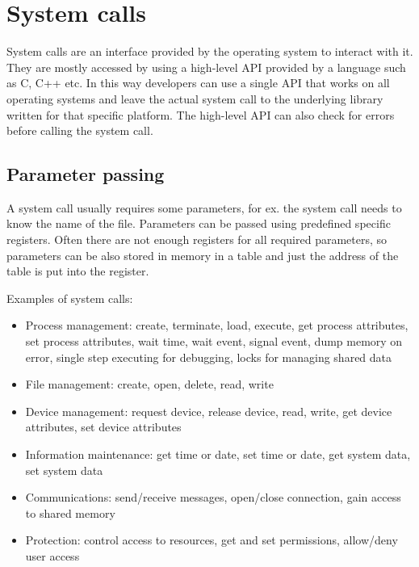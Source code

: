 \section{System calls}

System calls are an interface provided by the operating system to interact with it. They are mostly accessed by using a high-level API provided by a language such as C, C++ etc. In this way developers can use a single API that works on all operating systems and leave the actual system call to the underlying library written for that specific platform. The high-level API can also check for errors before calling the system call.


\subsection{Parameter passing}

A system call usually requires some parameters, for ex. the  system call needs to know the name of the file. Parameters can be passed using predefined specific registers. Often there are not enough registers for all required parameters, so parameters can be also stored in memory in a table and just the address of the table is put into the register.


Examples of system calls:
\begin{itemize}
    \item Process management: create, terminate, load, execute, get process attributes, set process attributes, wait time, wait event, signal event, dump memory on error, single step executing for debugging, locks for managing shared data
    \item File management: create, open, delete, read, write
    \item Device management: request device, release device, read, write, get device attributes, set device attributes
    \item Information maintenance: get time or date, set time or date, get system data, set system data
    \item Communications: send/receive messages, open/close connection, gain access to shared memory
    \item Protection: control access to resources, get and set permissions, allow/deny user access
\end{itemize}

